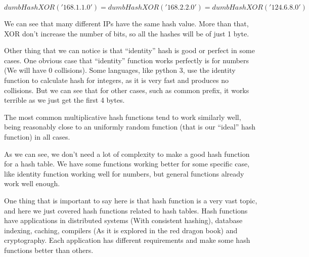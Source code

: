 \[ dumbHashXOR('168.1.1.0') = dumbHashXOR('168.2.2.0') = dumbHashXOR('124.6.8.0') \]

We can see that many different IPs have the same hash value. More than that, XOR don't increase the number of bits, so all the hashes will be of just 1 byte.

Other thing that we can notice is that ``identity'' hash is good or perfect in some cases. One obvious case that ``identity'' function works perfectly is for numbers (We will have 0 collisions). Some languages, like python 3, use the identity function to calculate hash for integers, as it is very fast and produces no collisions. But we can see that for other cases, such as common prefix, it works terrible as we just get the first 4 bytes.

The most common multiplicative hash functions tend to work similarly well, being reasonably close to an uniformly random function (that is our ``ideal'' hash function) in all cases.

As we can see, we don't need a lot of complexity to make a good hash function for a hash table. We have some functions working better for some specific case, like identity function working well for numbers, but general functions already work well enough.

One thing that is important to say here is that hash function is a very vast topic, and here we just covered hash functions related to hash tables. Hash functions have applications in distributed systems (With consistent hashing), database indexing, caching, compilers (As it is explored in the red dragon book) and cryptography. Each application has different requirements and make some hash functions better than others.